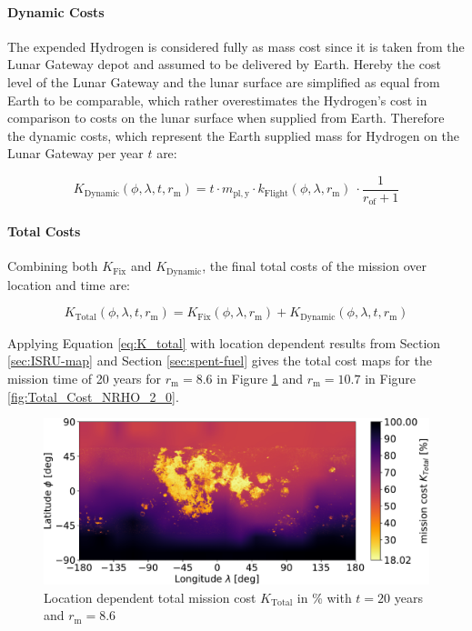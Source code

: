 \documentclass[utf8]{FrontiersinHarvard} %
\begin{document}
\paragraph{Dynamic Costs}
The expended Hydrogen is considered fully as mass cost since it is taken from the Lunar Gateway depot and assumed to be delivered by Earth.
Hereby the cost level of the Lunar Gateway and the lunar surface are simplified as equal from Earth to be comparable, which rather overestimates the Hydrogen's cost in comparison to costs on the lunar surface when supplied from Earth.
Therefore the dynamic costs, which represent the Earth supplied mass for Hydrogen on the Lunar Gateway per year $t$ are:

\begin{equation}
\displaystyle K_{\mathrm{Dynamic}}(\phi,\lambda,t,r_{\mathrm{m}}) = t \cdot m_{\mathrm{pl,y}} \cdot  k_{\mathrm{Flight}}(\phi,\lambda,r_{\mathrm{m}}) \  \cdot \frac{1}{r_{\mathrm{of}}+1}
\label{eq:K_dyn}
\end{equation}

\paragraph{Total Costs}
Combining both $K_{\mathrm{Fix}}$ and $K_{\mathrm{Dynamic}}$, the final total costs of the mission over location and time are:

\begin{equation}
\displaystyle K_{\mathrm{Total}}(\phi,\lambda,t,r_{\mathrm{m}}) = K_{\mathrm{Fix}}(\phi,\lambda,r_{\mathrm{m}}) + K_{\mathrm{Dynamic}}(\phi,\lambda,t,r_{\mathrm{m}})
\label{eq:K_total}
\end{equation}


\label{sec:total-map}

Applying Equation \ref{eq:K_total} with location dependent results from Section \ref{sec:ISRU-map} and Section \ref{sec:spent-fuel} gives the total cost maps for the mission time of 20 years for $r_{\mathrm{m}}=8.6$ in Figure \ref{fig:Total_Cost_NRHO_1_5} and $r_{\mathrm{m}}=10.7$ in Figure \ref{fig:Total_Cost_NRHO_2_0}.

\begin{figure}[h!]
\begin{center}
\includegraphics[width=\linewidth]{img/Total_Cost_NRHO_1_5.pdf}
\end{center}
\caption{Location dependent total mission cost $K_{\mathrm{Total}}$ in \% with $t=20$ years and $r_{\mathrm{m}}=8.6$}
\label{fig:Total_Cost_NRHO_1_5}
\end{figure}
\end{document}

